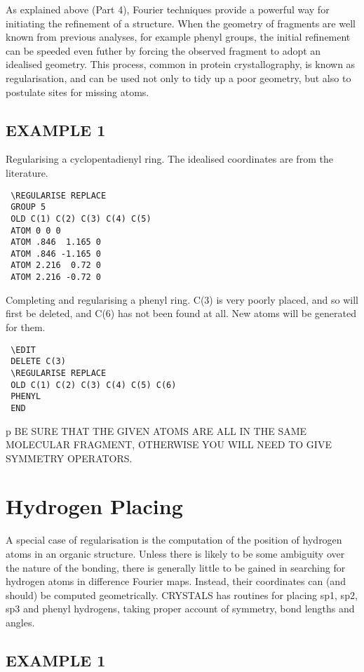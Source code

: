 \documentclass[10pt,a4paper]{report}
\begin{document}
As explained above (Part 4), Fourier techniques provide a powerful way  for initiating the refinement of a structure. When the geometry of fragments are well known from previous analyses, for example phenyl groups, the initial refinement can be speeded even futher by forcing the observed fragment to adopt an idealised geometry. This process, common in protein crystallography, is known as regularisation, and can be used not only to tidy up a poor geometry, but also to postulate sites for missing atoms.

\section{EXAMPLE 1}





Regularising a cyclopentadienyl ring. The idealised coordinates are from
 the literature.

\small\begin{verbatim}
 \REGULARISE REPLACE
 GROUP 5
 OLD C(1) C(2) C(3) C(4) C(5)
 ATOM 0 0 0
 ATOM .846  1.165 0
 ATOM .846 -1.165 0
 ATOM 2.216  0.72 0
 ATOM 2.216 -0.72 0
\end{verbatim}\normalsize




Completing and regularising a phenyl ring. C(3) is very poorly placed,
 and so will first be deleted, and C(6) has not been found at all. 
 New atoms will be generated for them.

\small\begin{verbatim}
 \EDIT
 DELETE C(3)
 \REGULARISE REPLACE
 OLD C(1) C(2) C(3) C(4) C(5) C(6)
 PHENYL
 END
\end{verbatim}\normalsize





p
 BE SURE THAT THE GIVEN ATOMS ARE ALL IN THE SAME MOLECULAR 
 FRAGMENT, OTHERWISE YOU WILL NEED TO GIVE SYMMETRY OPERATORS.



\chapter{Hydrogen Placing}


A special case of regularisation is the computation of the position of hydrogen atoms in an organic structure. Unless there is likely to be  some ambiguity over the nature of the bonding, there is generally little to be gained in searching for hydrogen atoms in difference Fourier maps. Instead, their coordinates can (and should) be computed geometrically. CRYSTALS has routines for placing sp1, sp2, sp3 and phenyl hydrogens, taking proper account of symmetry, bond lengths and angles.\section{EXAMPLE 1}
\end{document}
